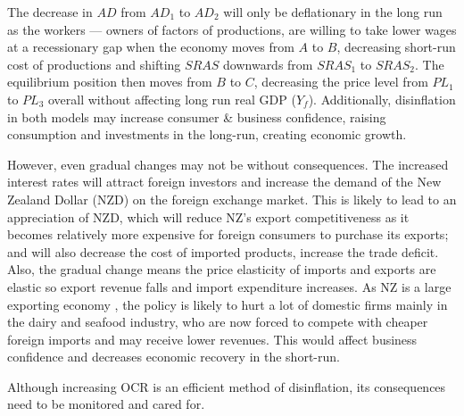 \documentclass[a4paper,12pt]{article}
\begin{document}
The decrease in $AD$ from $AD_1$ to $AD_2$ will only be deflationary in the long run as the workers --- owners of factors of productions, are willing to take lower wages at a recessionary gap when the economy moves from $A$ to $B$, decreasing short-run cost of productions and shifting $SRAS$ downwards from $SRAS_1$ to $SRAS_2$. The equilibrium position then moves from $B$ to $C$, decreasing the price level from $PL_1$ to $PL_3$ overall without affecting long run real GDP ($Y_f$). Additionally, disinflation in both models may increase consumer \& business confidence, raising consumption and investments in the long-run, creating economic growth.

However, even gradual changes may not be without consequences. The increased interest rates will attract foreign investors and increase the demand of the New Zealand Dollar (NZD) on the foreign exchange market. This is likely to lead to an appreciation of NZD, which will reduce NZ's export competitiveness as it becomes relatively more expensive for foreign consumers to purchase its exports; and will also decrease the cost of imported products, increase the trade deficit. Also, the gradual change means the price elasticity of imports and exports are elastic so export revenue falls and import expenditure increases. As NZ is a large exporting economy \parencite{exports}, the policy is likely to hurt a lot of domestic firms mainly in the dairy and seafood industry, who are now forced to compete with cheaper foreign imports and may receive lower revenues. This would affect business confidence and decreases economic recovery in the short-run.

Although increasing OCR is an efficient method of disinflation, its consequences need to be monitored and cared for.




\newpage
\printbibliography
\end{document}
